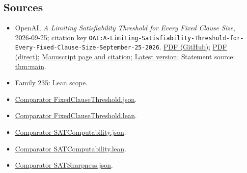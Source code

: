 \documentclass[11pt]{article}
\begin{document}
\subsection{Sources}
\begin{itemize}
\item OpenAI, \emph{A Limiting Satisfiability Threshold for Every Fixed Clause Size}, 2026-09-25; citation key \texttt{OAI:A-Limiting-Satisfiability-Threshold-for-Every-Fixed-Clause-Size-September-25-2026}. \href{https://github.com/openai/math/blob/adc7f1241b42e322a6451854ab7e4b4c146bf78a/preprints/A-Limiting-Satisfiability-Threshold-for-Every-Fixed-Clause-Size-September-25-2026/article.pdf}{PDF (GitHub)}; \href{https://github.com/openai/math/raw/adc7f1241b42e322a6451854ab7e4b4c146bf78a/preprints/A-Limiting-Satisfiability-Threshold-for-Every-Fixed-Clause-Size-September-25-2026/article.pdf}{PDF (direct)}; \href{https://github.com/openai/math/blob/adc7f1241b42e322a6451854ab7e4b4c146bf78a/preprints/A-Limiting-Satisfiability-Threshold-for-Every-Fixed-Clause-Size-September-25-2026/README.md}{Manuscript page and citation}; \href{https://github.com/openai/math/blob/main/preprints/A-Limiting-Satisfiability-Threshold-for-Every-Fixed-Clause-Size-September-25-2026/article.pdf}{Latest version}; Statement source: \href{https://github.com/openai/math/blob/adc7f1241b42e322a6451854ab7e4b4c146bf78a/preprints/A-Limiting-Satisfiability-Threshold-for-Every-Fixed-Clause-Size-September-25-2026/build/source/sections/introduction.tex\#L31}{thm:main}.
\item Family 235: \href{https://github.com/openai/math/blob/adc7f1241b42e322a6451854ab7e4b4c146bf78a/lean/docs/235.md}{Lean scope}.
\item \href{https://github.com/openai/math/blob/adc7f1241b42e322a6451854ab7e4b4c146bf78a/lean/ComparatorChallenges/FixedClauseThreshold.json}{Comparator FixedClauseThreshold.json}.
\item \href{https://github.com/openai/math/blob/adc7f1241b42e322a6451854ab7e4b4c146bf78a/lean/ComparatorChallenges/FixedClauseThreshold.lean}{Comparator FixedClauseThreshold.lean}.
\item \href{https://github.com/openai/math/blob/adc7f1241b42e322a6451854ab7e4b4c146bf78a/lean/ComparatorChallenges/SATComputability.json}{Comparator SATComputability.json}.
\item \href{https://github.com/openai/math/blob/adc7f1241b42e322a6451854ab7e4b4c146bf78a/lean/ComparatorChallenges/SATComputability.lean}{Comparator SATComputability.lean}.
\item \href{https://github.com/openai/math/blob/adc7f1241b42e322a6451854ab7e4b4c146bf78a/lean/ComparatorChallenges/SATSharpness.json}{Comparator SATSharpness.json}.

\end{itemize}
\end{document}
